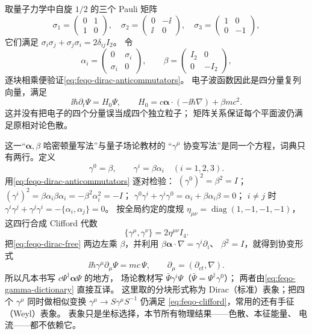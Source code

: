 取量子力学中自旋 \(1/2\) 的三个 Pauli 矩阵
\[
\sigma_1=\begin{pmatrix}0&1\\1&0\end{pmatrix},\quad
\sigma_2=\begin{pmatrix}0&-\ii\\\ii&0\end{pmatrix},\quad
\sigma_3=\begin{pmatrix}1&0\\0&-1\end{pmatrix},
\]
它们满足 \(\sigma_i\sigma_j+\sigma_j\sigma_i=2\delta_{ij}I_2\)。
令
\[
\alpha_i=\begin{pmatrix}0&\sigma_i\\\sigma_i&0\end{pmatrix},
\qquad
\beta=\begin{pmatrix}I_2&0\\0&-I_2\end{pmatrix},
\]
逐块相乘便验证\cref{eq:feqo-dirac-anticommutators}。
电子波函数因此是四分量复列向量，满足
\begin{equation}
\ii\hbar\partial_t\Psi
=H_0\Psi,\qquad
H_0=c\boldsymbol\alpha\cdot(-\ii\hbar\nabla)+\beta mc^2.
\label{eq:feqo-dirac-free}
\end{equation}
这并没有把电子的四个分量误当成四个独立粒子；
矩阵关系保证每个平面波仍满足原相对论色散。

这一“\(\boldsymbol\alpha,\beta\) 哈密顿量写法”与量子场论教材的
“\(\gamma^\mu\) 协变写法”是同一个方程，词典只有两行。定义
\begin{equation}
\gamma^0=\beta,\qquad \gamma^i=\beta\alpha_i\quad(i=1,2,3).
\label{eq:feqo-gamma-dictionary}
\end{equation}
用\cref{eq:feqo-dirac-anticommutators} 逐对检验：
\((\gamma^0)^2=\beta^2=I\)；
\((\gamma^i)^2=\beta\alpha_i\beta\alpha_i=-\beta^2\alpha_i^2=-I\)；
\(\gamma^0\gamma^i+\gamma^i\gamma^0
=\alpha_i+\beta\alpha_i\beta=0\)；
\(i\neq j\) 时 \(\gamma^i\gamma^j+\gamma^j\gamma^i
=-\{\alpha_i,\alpha_j\}=0\)。
按全局约定的度规 \(\eta_{\mu\nu}=\operatorname{diag}(1,-1,-1,-1)\)，
这四行合成 Clifford 代数
\begin{equation}
\{\gamma^\mu,\gamma^\nu\}=2\eta^{\mu\nu}I_4 .
\label{eq:feqo-clifford}
\end{equation}
把\cref{eq:feqo-dirac-free} 两边左乘 \(\beta\)，并利用
\(\beta\boldsymbol\alpha\cdot\nabla=\gamma^i\partial_i\)、
\(\beta^2=I\)，就得到协变形式
\begin{equation}
\ii\hbar\gamma^\mu\partial_\mu\Psi=mc\,\Psi,
\qquad \partial_\mu=(\partial_{ct},\nabla).
\label{eq:feqo-dirac-covariant}
\end{equation}
所以凡本书写 \(c\Psi^\dagger\boldsymbol\alpha\Psi\) 的地方，
场论教材写 \(\bar\Psi\gamma^i\Psi\)（\(\bar\Psi=\Psi^\dagger\gamma^0\)）；
两者由\cref{eq:feqo-gamma-dictionary} 直接互译。
这里取的分块形式称为 Dirac（标准）表象；把四个 \(\gamma^\mu\)
同时做相似变换 \(\gamma^\mu\to S\gamma^\mu S^{-1}\) 仍满足
\cref{eq:feqo-clifford}，常用的还有手征（Weyl）表象。
表象只是坐标选择，本节所有物理结果——色散、本征能量、
电流——都不依赖它。


